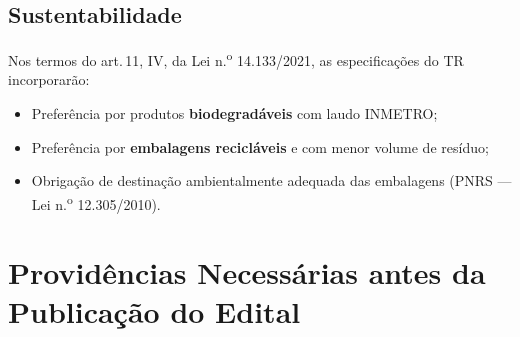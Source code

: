 \documentclass[12pt,a4paper]{article}
\begin{document}
\subsection{Sustentabilidade}

Nos termos do art.\,11, IV, da Lei n.\textsuperscript{o} 14.133/2021, as especificações
do TR incorporarão:

\begin{itemize}
  \item Preferência por produtos \textbf{biodegradáveis} com laudo INMETRO;
  \item Preferência por \textbf{embalagens recicláveis} e com menor volume de resíduo;
  \item Obrigação de destinação ambientalmente adequada das embalagens (PNRS ---
    Lei n.\textsuperscript{o} 12.305/2010).
\end{itemize}

\section{Providências Necessárias antes da Publicação do Edital}
\end{document}
